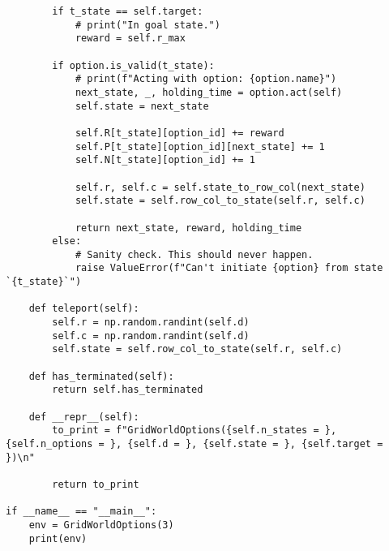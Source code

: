 \begin{verbatim}
        if t_state == self.target:
            # print("In goal state.")
            reward = self.r_max

        if option.is_valid(t_state):
            # print(f"Acting with option: {option.name}")
            next_state, _, holding_time = option.act(self)
            self.state = next_state

            self.R[t_state][option_id] += reward
            self.P[t_state][option_id][next_state] += 1
            self.N[t_state][option_id] += 1

            self.r, self.c = self.state_to_row_col(next_state)
            self.state = self.row_col_to_state(self.r, self.c)

            return next_state, reward, holding_time
        else:
            # Sanity check. This should never happen.
            raise ValueError(f"Can't initiate {option} from state `{t_state}`")

    def teleport(self):
        self.r = np.random.randint(self.d)
        self.c = np.random.randint(self.d)
        self.state = self.row_col_to_state(self.r, self.c)

    def has_terminated(self):
        return self.has_terminated

    def __repr__(self):
        to_print = f"GridWorldOptions({self.n_states = }, {self.n_options = }, {self.d = }, {self.state = }, {self.target = })\n"

        return to_print

if __name__ == "__main__":
    env = GridWorldOptions(3)
    print(env)
\end{verbatim}

\newpage
